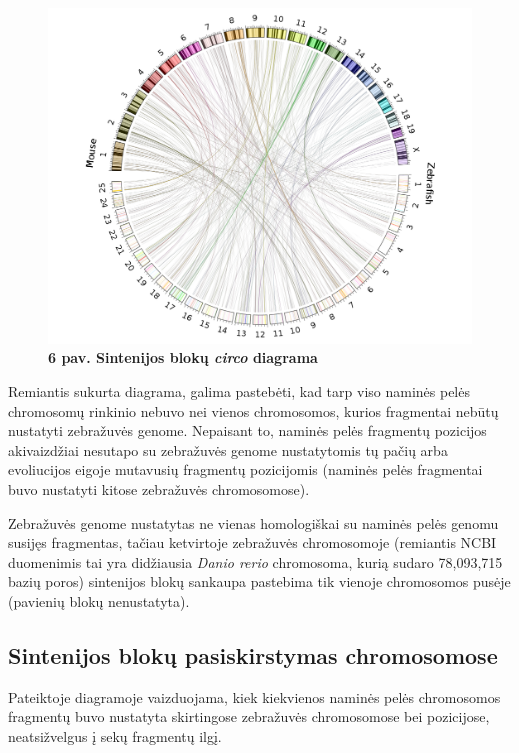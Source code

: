 \documentclass[12pt]{article}
\begin{document}
\begin{figure}[htb]
    \begin{center}
        \includegraphics[width=0.8\linewidth]{../Figures/SynCircos.png}
        \vspace{-1\baselineskip}
        \caption*{\small\textbf{6 pav. Sintenijos blokų \emph{circo}
        diagrama}}
        \label{fig:birds}
    \end{center}
\end{figure}

Remiantis sukurta diagrama, galima pastebėti, kad tarp viso naminės pelės
chromosomų rinkinio nebuvo nei vienos chromosomos, kurios fragmentai nebūtų
nustatyti zebražuvės genome. Nepaisant to, naminės pelės fragmentų
pozicijos akivaizdžiai nesutapo su zebražuvės genome nustatytomis tų pačių
arba evoliucijos eigoje mutavusių fragmentų pozicijomis (naminės pelės
fragmentai buvo nustatyti kitose zebražuvės chromosomose).

Zebražuvės genome nustatytas ne vienas homologiškai su naminės pelės genomu
susijęs fragmentas, tačiau ketvirtoje zebražuvės chromosomoje (remiantis
NCBI\cite{NCBI} duomenimis tai yra didžiausia \emph{Danio rerio} chromosoma,
kurią sudaro 78,093,715 bazių poros) sintenijos blokų sankaupa pastebima
tik vienoje chromosomos pusėje (pavienių blokų nenustatyta).

\subsection{Sintenijos blokų pasiskirstymas chromosomose}
Pateiktoje diagramoje vaizduojama, kiek kiekvienos naminės pelės chromosomos
fragmentų buvo nustatyta skirtingose zebražuvės chromosomose bei pozicijose,
neatsižvelgus į sekų fragmentų ilgį.
\end{document}
